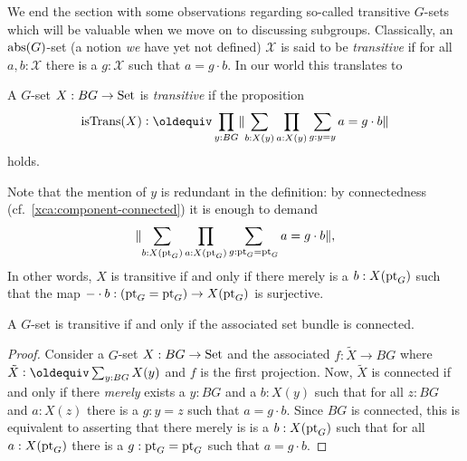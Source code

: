 \label{sec:transitiveGsets}
We end the section with some observations regarding so-called transitive $G$-sets which will be valuable when we move on to discussing subgroups.
Classically, an $\mathrm{abs}(G)$-set (a notion \emph{we} have yet not defined) $\mathcal X$ is said to be \emph{transitive} if for all $a,b:\mathcal X$ there is a $g:\mathcal X$ such that $a=g\cdot b$.  In our world this translates to
\begin{definition}
  \label{def:connectedGset}\label{def:transitiveGset}
  A $G$-set $X:BG\to\mathord{\mathrm{Set}}$ is \emph{transitive} if the proposition
$$\mathrm{isTrans}(X)\defequi\prod_{y:BG}\Trunc{\sum_{b:X(y)}\prod_{a:X(y)}\sum_{g:y=y}a=g\cdot b}$$
holds.
\end{definition}
Note that the mention of $y$ is redundant in the definition: by
connectedness (cf.~\cref{xca:component-connected}) it is enough to
demand
\begin{displaymath}
  \lVert\sum_{b:X(\mathrm{pt}_G)}\prod_{a:X(\mathrm{pt}_G)}\sum_{g:\mathrm{pt}_G=\mathrm{pt}_G}a=g\cdot b\rVert,
\end{displaymath}
In other words, $X$ is transitive if and only if there merely is a
$b:X(\mathrm{pt}_G)$ such that the map $-\cdot b:(\mathrm{pt}_G=\mathrm{pt}_G)\to X(\mathrm{pt}_G)$ is
surjective.

\begin{lemma}
  \label{lem:conistrans}
  A $G$-set  is transitive if and only if the associated set bundle is connected.
\end{lemma}
\begin{proof}
  Consider a $G$-set $X:BG\to\mathord{\mathrm{Set}}$ and the associated \covering
  $f:\tilde X\to BG$ where $\tilde X\defequi\sum_{y:BG}X(y)$ and $f$
  is the first projection.  Now, $\tilde X$ is connected if and only
  if there {\em merely} exists a $y:BG$ and a $b:X(y)$ such that for
  all $z:BG$ and $a:X(z)$ there is a $g:y=z$ such that $a=g\cdot b$.
  Since $BG$ is connected, this is equivalent to asserting that there
  merely is is a $b:X(\mathrm{pt}_G)$ such that for all $a:X(\mathrm{pt}_G)$ there is
  a $g:\mathrm{pt}_G=\mathrm{pt}_G$ such that $a=g\cdot b$.
\end{proof}


